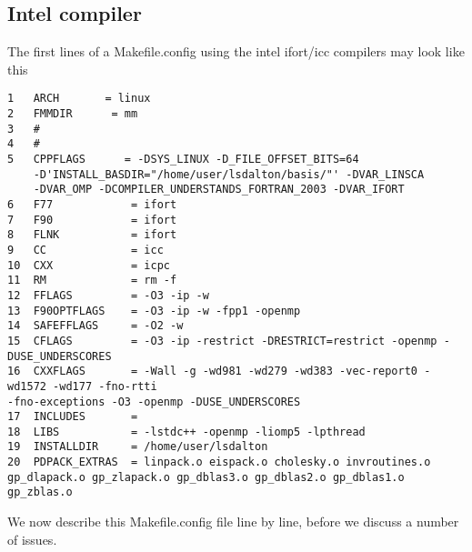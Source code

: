 \subsection{Intel compiler}\label{ifortMakefile}
The first lines of a Makefile.config using the intel ifort/icc compilers may look like this
\begin{verbatim}
1   ARCH       = linux
2   FMMDIR      = mm
3   #
4   #
5   CPPFLAGS      = -DSYS_LINUX -D_FILE_OFFSET_BITS=64
    -D'INSTALL_BASDIR="/home/user/lsdalton/basis/"' -DVAR_LINSCA 
    -DVAR_OMP -DCOMPILER_UNDERSTANDS_FORTRAN_2003 -DVAR_IFORT
6   F77            = ifort
7   F90            = ifort
8   FLNK           = ifort
9   CC             = icc
10  CXX            = icpc
11  RM             = rm -f
12  FFLAGS         = -O3 -ip -w
13  F90OPTFLAGS    = -O3 -ip -w -fpp1 -openmp
14  SAFEFFLAGS     = -O2 -w
15  CFLAGS         = -O3 -ip -restrict -DRESTRICT=restrict -openmp -DUSE_UNDERSCORES
16  CXXFLAGS       = -Wall -g -wd981 -wd279 -wd383 -vec-report0 -wd1572 -wd177 -fno-rtti 
-fno-exceptions -O3 -openmp -DUSE_UNDERSCORES
17  INCLUDES       = 
18  LIBS           = -lstdc++ -openmp -liomp5 -lpthread 
19  INSTALLDIR     = /home/user/lsdalton
20  PDPACK_EXTRAS  = linpack.o eispack.o cholesky.o invroutines.o 
gp_dlapack.o gp_zlapack.o gp_dblas3.o gp_dblas2.o gp_dblas1.o gp_zblas.o
\end{verbatim}
We now describe this Makefile.config file line by line, before we discuss a number of issues.

